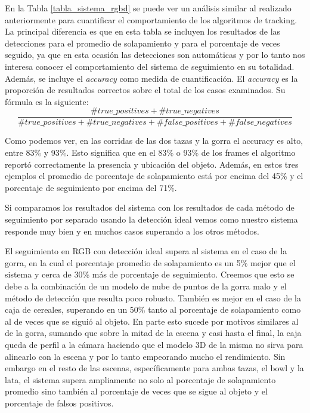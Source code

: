 En la Tabla \ref{tabla_sistema_rgbd} se puede ver un análisis similar al realizado anteriormente para cuantificar el comportamiento de los algoritmos de tracking. La principal diferencia es que en esta tabla se incluyen los resultados de las detecciones para el promedio de solapamiento y para el porcentaje de veces seguido, ya que en esta ocasión las detecciones son automáticas y por lo tanto nos interesa conocer el comportamiento del sistema de seguimiento en su totalidad. Además, se incluye el \textit{accuracy} como medida de cuantificación. El \textit{accuracy} es la proporción de resultados correctos sobre el total de los casos examinados. Su fórmula es la siguiente:
\begin{equation}
\frac{\#true\_positives + \#true\_negatives}{\#true\_positives + \#true\_negatives + \#false\_positives + \#false\_negatives}
\end{equation}

Como podemos ver, en las corridas de las dos tazas y la gorra el accuracy es alto, entre 83\% y 93\%. Esto significa que en el 83\% o 93\% de los frames el algoritmo reportó correctamente la presencia y ubicación del objeto. Además, en estos tres ejemplos el promedio de porcentaje de solapamiento está por encima del 45\% y el porcentaje de seguimiento por encima del 71\%.

Si comparamos los resultados del sistema con los resultados de cada método de seguimiento por separado usando la detección ideal vemos como nuestro sistema responde muy bien y en muchos casos superando a los otros métodos.

El seguimiento en RGB con detección ideal supera al sistema en el caso de la gorra, en la cual el porcentaje promedio de solapamiento es un 5\% mejor que el sistema y cerca de 30\% más de porcentaje de seguimiento. Creemos que esto se debe a la combinación de un modelo de nube de puntos de la gorra malo y el método de detección que resulta poco robusto. También es mejor en el caso de la caja de cereales, superando en un 50\% tanto al porcentaje de solapamiento como al de veces que se siguió al objeto. En parte esto sucede por motivos similares al de la gorra, sumando que sobre la mitad de la escena y casi hasta el final, la caja queda de perfil a la cámara haciendo que el modelo 3D de la misma no sirva para alinearlo con la escena y por lo tanto empeorando mucho el rendimiento. Sin embargo en el resto de las escenas, específicamente para ambas tazas, el bowl y la lata, el sistema supera ampliamente no solo al porcentaje de solapamiento promedio sino también al porcentaje de veces que se sigue al objeto y el porcentaje de falsos positivos.

